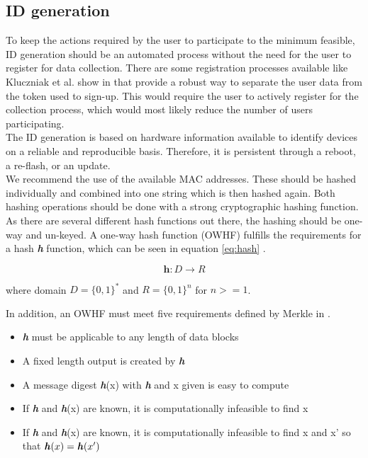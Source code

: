           
    \subsection{ID generation}
        \label{subsec:software_design:id}
        To keep the actions required by the user to participate to the minimum feasible, ID generation should be an automated process without the need for the user to register for data collection. There are some registration processes available like Kluczniak et al. show in  \cite{kluczniak_anonymous_2015} that provide a robust way to separate the user data from the token used to sign-up. This would require the user to actively register for the collection process, which would most likely reduce the number of users participating.\\
        
        The ID generation is based on hardware information available to identify devices on a reliable and reproducible basis. Therefore, it is persistent through a reboot, a re-flash, or an update.\\
        We recommend the use of the available MAC addresses. These should be hashed individually and combined into one string which is then hashed again. Both hashing operations should be done with a strong cryptographic hashing function.
        As there are several different hash functions out there, the hashing should be one-way and un-keyed. A one-way hash function (OWHF) fulfills the requirements for a hash \textbf{\textit{h}} function, which can be seen in equation \ref{eq:hash} \cite{sobti_cryptographic_2012}.
        
        \begin{equation}
            \label{eq:hash}
            \textbf{h} : D \longrightarrow R
        \end{equation}
        
        where domain $D = \{0,1\}^*$ and $R=\{0,1\}^n$ for $n >= 1$.

\newpage

        In addition, an OWHF must meet five requirements defined by Merkle in  \cite{merkle_secrecy_1979}.
        \begin{itemize}
            \item \textbf{\textit{h}} must be applicable to any length of data blocks
            \item A fixed length output is created by \textbf{\textit{h}}
            \item A message digest \textbf{\textit{h}}(x) with \textbf{\textit{h}} and x given is easy to compute
            \item If \textbf{\textit{h}} and \textbf{\textit{h}}(x) are known, it is computationally infeasible to find x
            \item If \textbf{\textit{h}} and \textbf{\textit{h}}(x) are known, it is computationally infeasible to find x and x' so that $\textbf{\textit{h}}(x) = \textbf{\textit{h}}(x')$
        \end{itemize}
        
